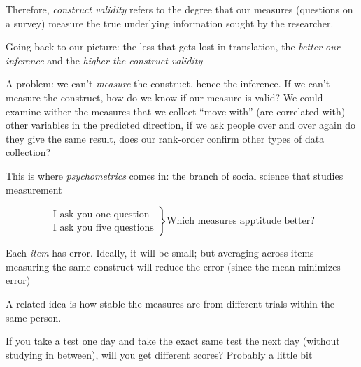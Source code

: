 \documentclass[11pt]{lecturenotes}
\begin{document}
\slide
Therefore, \emph{construct validity} refers to the degree that our measures (questions on a survey) measure the true underlying information sought by the researcher. 

Going back to our picture: the less that gets lost in translation, the \emph{better our inference} and the \emph{higher the construct validity}

\slide
\begin{center}
\end{center}

A problem: we can't \emph{measure} the construct, hence the inference. If we can't measure the construct, how do we know if our measure is valid? We could examine wither the measures that we collect ``move with'' (are correlated with) other variables in the predicted direction, if we ask people over and over again do they give the same result, does our rank-order confirm other types of data collection?

This is where \emph{psychometrics} comes in: the branch of social science that studies measurement

\slide
\[
\left.
\begin{array}{l}
\text{I ask you one question} \\
\text{I ask you five questions}
\end{array}\right\} \text{Which measures apptitude better?}
\]

Each \emph{item} has error. Ideally, it will be small; but averaging across items measuring the same construct will reduce the error (since the mean minimizes error)

A related idea is how stable the measures are from different trials within the same person.

\slide
{}

If you take a test one day and take the exact same test the next day (without studying in between), will you get different scores? Probably a little bit 
\end{document}
